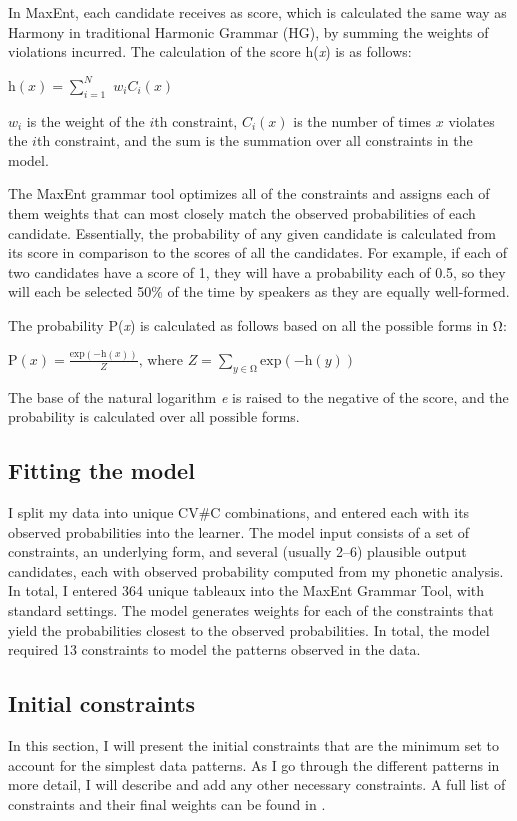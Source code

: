 \documentclass[output=paper,newtxmath,modfonts,nonflat,draftmode]{langsci/langscibook}
\begin{document}
In MaxEnt, each candidate receives as score, which is calculated the same way as Harmony in traditional Harmonic Grammar (HG), by summing the weights of violations incurred. The calculation of the score h(\textit{x}) is as follows: 

\ea
$ \mathrm{h}(x) = \sum_{\textit{i}=1}^{\textit{N}}$ ${w_i}{C_i}(x)$
\z

${w_i}$ is the weight of the $i$th constraint, ${C_i}(x)$ is the number of times $x$ violates the $i$th constraint, and the sum is the summation over all constraints in the model.  

The MaxEnt grammar tool \citep{WilsonHayesGeorge08} optimizes all of the constraints and assigns each of them weights that can most closely match the observed probabilities of each candidate. Essentially, the probability of any given candidate is calculated from its score in comparison to the scores of all the candidates. For example, if each of two candidates have a score of 1, they will have a probability each of 0.5, so they will each be selected 50\% of the time by speakers as they are equally well-formed.

The probability P(\textit{x}) is calculated as follows based on all the possible forms in Ω:

\ea 
$ \mathrm{P}(x) = \frac{\mathrm{exp}(-\mathrm{h}(x))}{Z}\text{, where } Z = \sum_{y\in \mathrm{Ω}} \mathrm{exp}(-\mathrm{h}(y))$  
\z

The base of the natural logarithm \textit{e} is raised to the negative of the score, and the probability is calculated over all possible forms. 

\subsection{Fitting the model}

I split my data into unique CV\#C combinations, and entered each with its observed probabilities into the learner. The model input consists of a set of constraints, an underlying form, and several (usually 2--6) plausible output candidates, each with observed probability computed from my phonetic analysis. In total, I entered 364 unique tableaux into the MaxEnt Grammar Tool, with standard settings. The model generates weights for each of the constraints that yield the probabilities closest to the observed probabilities. In total, the model required 13 constraints to model the patterns observed in the data. 

\subsection{Initial constraints}
In this section, I will present the initial constraints that are the minimum set to account for the simplest data patterns. As I go through the different patterns in more detail, I will describe and add any other necessary constraints. A full list of constraints and their final weights can be found in . 
\end{document}
